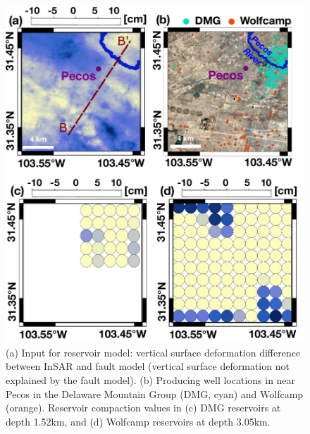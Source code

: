 \documentclass{utexasthesis}
\begin{document}
\begin{figure}
	\centering
	\includegraphics[width=\textwidth]{paper1-permian/figures/supplement/figureS11-reservoir-wells.pdf}
	\caption{(a) Input for reservoir model: vertical surface deformation difference between InSAR and fault model (vertical surface deformation not explained by the fault model). (b) Producing well locations in near Pecos in the Delaware Mountain Group (DMG, cyan) and Wolfcamp (orange). Reservoir compaction values in (c) DMG reservoirs at depth 1.52km, and (d) Wolfcamp reservoirs at depth 3.05km. 
	}
	\label{fig:model-reservoir-wells}
\end{figure}
\end{document}
